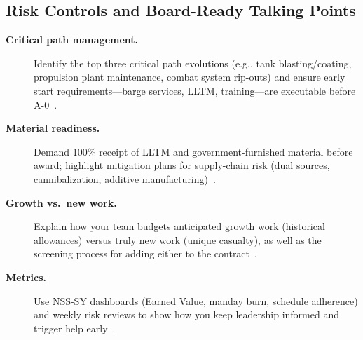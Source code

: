 \documentclass[../main.tex]{subfiles}
\begin{document}
\subsection{Risk Controls and Board-Ready Talking Points}
\begin{description}
\item[\textbf{Critical path management.}] Identify the top three critical path evolutions (e.g., tank blasting/coating, propulsion plant maintenance, combat system rip-outs) and ensure early start requirements—barge services, LLTM, training—are executable before A-0~\autocite{edo-4-2-1-cno-availability-planning-2025}.
\item[\textbf{Material readiness.}] Demand 100\% receipt of LLTM and government-furnished material before award; highlight mitigation plans for supply-chain risk (dual sources, cannibalization, additive manufacturing)~\autocite{edo-4-2-1-cno-availability-planning-2025}.
\item[\textbf{Growth vs.\ new work.}] Explain how your team budgets anticipated growth work (historical allowances) versus truly new work (unique casualty), as well as the screening process for adding either to the contract~\autocite{COMFLTFORCOMINST4790-3}.
\item[\textbf{Metrics.}] Use NSS-SY dashboards (Earned Value, manday burn, schedule adherence) and weekly risk reviews to show how you keep leadership informed and trigger help early~\autocite{edo-4-2-1-cno-availability-planning-2025}.
\end{description}

\end{document}
